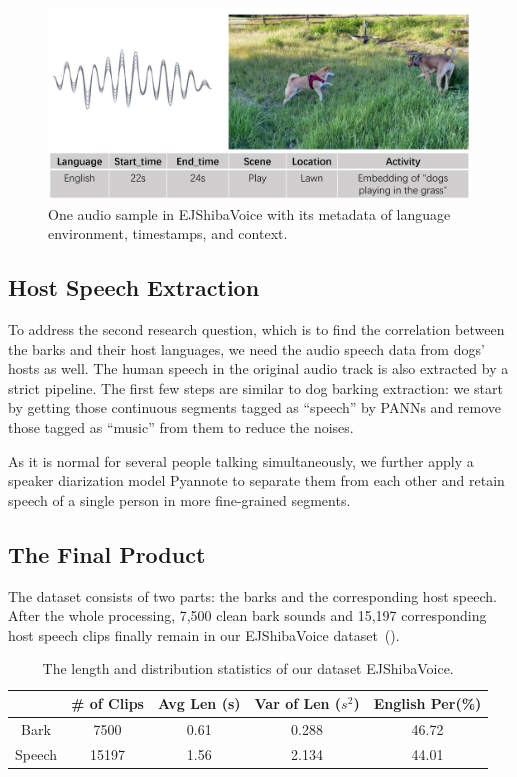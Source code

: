 \begin{figure}[th]
	\centering
	\includegraphics[width=\columnwidth]{images/sample.jpg}
	\caption{One audio sample in EJShibaVoice with its metadata of language environment, 
timestamps, and context.} 
	\label{fig:EJShiba}
\end{figure}


\subsection{Host Speech Extraction}
\label{sec:speechextraction}
To address the second research question, which is to find
the correlation between the barks and their host languages, 
we need the audio speech data from dogs' hosts as well. 
The human speech in the original audio track is also extracted by a 
strict pipeline. The first few steps are similar to dog barking extraction: 
we start by getting those continuous segments tagged as ``speech'' by PANNs and 
remove those tagged as ``music'' from them to reduce the noises.

As it is normal for several people talking simultaneously, we further apply a speaker diarization 
model Pyannote\cite{Bredin2020, Bredin2021} to separate them from each other and retain speech of a single person 
in more fine-grained segments.

\subsection{The Final Product}
The dataset consists of two parts: the barks and the corresponding host speech. After the whole processing, 7,500 clean bark sounds and 15,197 corresponding host speech clips 
finally remain in our EJShibaVoice dataset~().

\begin{table}[th]
	\small
	\centering
	\begin{tabular}{c|c|c|c|c}
		\toprule
		{}            & \# of Clips & Avg Len (s) & Var of Len ($s^2$) & English Per(\%)\\
		\midrule
		{Bark} & 7500 & 0.61  &  0.288 & 46.72\\
		{Speech} & 15197 & 1.56 & 2.134 & 44.01\\
		\bottomrule
	\end{tabular}
	\caption{The length and distribution statistics of our dataset EJShibaVoice.
}
	\label{table:datasetlength}
\end{table}

